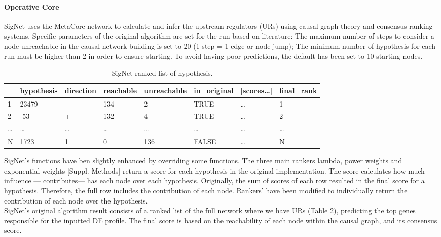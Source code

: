 \paragraph{Operative Core}
SigNet uses the MetaCore network to calculate and infer the upstream regulators (URs) using causal graph theory and consensus ranking systems. Specific parameters of the original algorithm are set for the run based on literature: The maximum number of steps to consider a node unreachable in the causal network building is set to 20 (1 step = 1 edge or node jump); The minimum number of hypothesis for each run must be higher than 2 in order to ensure starting. To avoid having poor predictions, the default has been set to 10 starting nodes.
\\
\begin{table}[]
\begin{tabular}{|l|l|l|l|l|l|l|l|}
\hline
  & hypothesis & direction & reachable & unreachable & in\_original & {[}scores…{]} & final\_rank \\ \hline
1 & 23479      & -         & 134       & 2           & TRUE         & …             & 1           \\ \hline
2 & -53        & +         & 132       & 4           & TRUE         & …             & 2           \\ \hline
… & …          & …         & …         & …           & …            & …             & …           \\ \hline
N & 1723       & 1         & 0         & 136         & FALSE        & …             & N           \\ \hline
\end{tabular}
\caption{SigNet ranked list of hypothesis.}
\label{tbl:signet_input}
\end{table}

SigNet’s functions have ben slightly enhanced by overriding some functions. The three main rankers lambda, power weights and exponential weights [Suppl. Methods] return a score for each hypothesis in the original implementation. The score calculates how much influence — contributes— has each node over each hypothesis. Originally, the sum of scores of each row resulted in the final score for a hypothesis. Therefore, the full row includes the contribution of each node. Rankers’ have been modified to individually return the contribution of each node over the hypothesis.
\\

SigNet’s original algorithm result consists of a ranked list of the full network where we have URs (Table 2), predicting the top genes responsible for the inputted DE profile. The final score is based on the reachability of each node within the causal graph, and its consensus score.
\\

